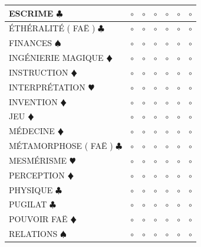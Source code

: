 \documentclass[a5paper,pagesize,french]{book}
\begin{document}
\begin{tabular}[c]{|p{}|p{}|p{}|p{}|p{}|p{}|p{}|}
	ESCRIME { $\clubsuit$ }								&	$\circ$	&	$\circ$	&	$\circ$	&	$\circ$	&	$\circ$		&	$\circ$		\\ \hline
	ÉTHÉRALITÉ ( FAË ) { $\clubsuit$ }					&	$\circ$	&	$\circ$	&	$\circ$	&	$\circ$	&	$\circ$		&	$\circ$		\\ \hline
	FINANCES { $\spadesuit$ }							&	$\circ$	&	$\circ$	&	$\circ$	&	$\circ$	&	$\circ$		&	$\circ$		\\ \hline
	INGÉNIERIE MAGIQUE {\color{red} $\vardiamond$ }		&	$\circ$	&	$\circ$	&	$\circ$	&	$\circ$	&	$\circ$		&	$\circ$		\\ \hline
	INSTRUCTION {\color{red} $\vardiamond$ }			&	$\circ$	&	$\circ$	&	$\circ$	&	$\circ$	&	$\circ$		&	$\circ$		\\ \hline
	INTERPRÉTATION {\color{red} $\varheart$ }			&	$\circ$	&	$\circ$	&	$\circ$	&	$\circ$	&	$\circ$		&	$\circ$		\\ \hline
	INVENTION {\color{red} $\vardiamond$ }				&	$\circ$	&	$\circ$	&	$\circ$	&	$\circ$	&	$\circ$		&	$\circ$		\\ \hline
	JEU {\color{red} $\vardiamond$ }					&	$\circ$	&	$\circ$	&	$\circ$	&	$\circ$	&	$\circ$		&	$\circ$		\\ \hline
	MÉDECINE {\color{red} $\vardiamond$ }				&	$\circ$	&	$\circ$	&	$\circ$	&	$\circ$	&	$\circ$		&	$\circ$		\\ \hline
	MÉTAMORPHOSE ( FAË ) { $\clubsuit$ }				&	$\circ$	&	$\circ$	&	$\circ$	&	$\circ$	&	$\circ$		&	$\circ$		\\ \hline
	MESMÉRISME {\color{red} $\varheart$ }				&	$\circ$	&	$\circ$	&	$\circ$	&	$\circ$	&	$\circ$		&	$\circ$		\\ \hline
	PERCEPTION {\color{red} $\vardiamond$ }				&	$\circ$	&	$\circ$	&	$\circ$	&	$\circ$	&	$\circ$		&	$\circ$		\\ \hline
	PHYSIQUE { $\clubsuit$ }							&	$\circ$	&	$\circ$	&	$\circ$	&	$\circ$	&	$\circ$		&	$\circ$		\\ \hline
	PUGILAT { $\clubsuit$ }								&	$\circ$	&	$\circ$	&	$\circ$	&	$\circ$	&	$\circ$		&	$\circ$		\\ \hline
	POUVOIR FAË {\color{red} $\vardiamond$ }			&	$\circ$	&	$\circ$	&	$\circ$	&	$\circ$	&	$\circ$		&	$\circ$		\\ \hline
	RELATIONS { $\spadesuit$ }							&	$\circ$	&	$\circ$	&	$\circ$	&	$\circ$	&	$\circ$		&	$\circ$		\\ \hline

\end{tabular}
\end{document}
